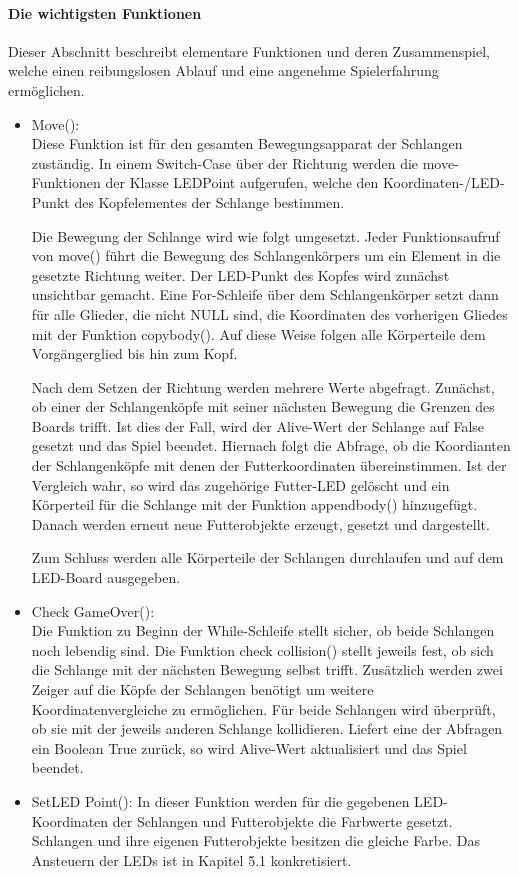 \documentclass[12pt,a4paper]{article}
\begin{document}
\paragraph{Die wichtigsten Funktionen}
Dieser Abschnitt beschreibt elementare Funktionen und deren Zusammenspiel, welche einen reibungslosen Ablauf und eine angenehme Spielerfahrung ermöglichen.
\begin{itemize}
\item Move(): \\
Diese Funktion ist für den gesamten Bewegungsapparat der Schlangen zuständig. In einem Switch-Case über der Richtung werden die move-Funktionen der Klasse LEDPoint aufgerufen, welche den Koordinaten-/LED-Punkt des Kopfelementes der Schlange bestimmen. 

Die Bewegung der Schlange wird wie folgt umgesetzt. Jeder Funktionsaufruf von move() führt die Bewegung des  Schlangenkörpers um ein Element in die gesetzte Richtung weiter. Der LED-Punkt des Kopfes wird zunächst unsichtbar gemacht. Eine For-Schleife über dem Schlangenkörper setzt dann für alle Glieder, die nicht NULL sind, die Koordinaten des vorherigen Gliedes mit der Funktion \glqq copybody()\grqq{}. Auf diese Weise folgen alle Körperteile dem Vorgängerglied bis hin zum Kopf.

Nach dem Setzen der Richtung werden mehrere Werte abgefragt. Zunächst, ob einer der Schlangenköpfe mit seiner nächsten Bewegung die Grenzen des Boards trifft. Ist dies der Fall, wird der Alive-Wert der Schlange auf False gesetzt und das Spiel beendet. Hiernach folgt die Abfrage, ob die Koordianten der Schlangenköpfe mit denen der Futterkoordinaten übereinstimmen. Ist der Vergleich wahr, so wird das zugehörige Futter-LED gelöscht und ein Körperteil für die Schlange mit der Funktion \glqq appendbody()\grqq{} hinzugefügt. Danach werden erneut  neue Futterobjekte erzeugt, gesetzt und dargestellt. 

Zum Schluss werden alle Körperteile der Schlangen durchlaufen und auf dem LED-Board ausgegeben. 

\item Check GameOver(): \\
Die Funktion zu Beginn der While-Schleife stellt sicher, ob beide Schlangen noch lebendig sind. Die Funktion \glqq check collision()\grqq{} stellt jeweils fest, ob sich die Schlange mit der nächsten Bewegung selbst trifft. Zusätzlich werden zwei Zeiger auf die Köpfe der Schlangen benötigt um weitere Koordinatenvergleiche zu ermöglichen. Für beide Schlangen wird überprüft, ob sie mit der jeweils anderen Schlange kollidieren. Liefert eine der Abfragen ein Boolean True zurück, so wird Alive-Wert aktualisiert und das Spiel beendet. 

\item SetLED Point(): 
In dieser Funktion werden für die gegebenen LED-Koordinaten der Schlangen und Futterobjekte die Farbwerte gesetzt. Schlangen und ihre eigenen Futterobjekte besitzen die gleiche Farbe. Das Ansteuern der LEDs ist in Kapitel 5.1 konkretisiert.  
\end{itemize}
\end{document}
